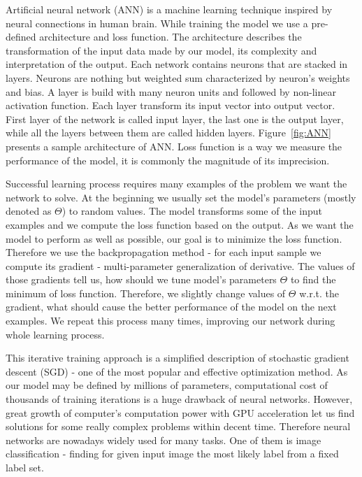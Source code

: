 \documentclass{article}
\begin{document}
Artificial neural network (ANN) is a machine learning technique inspired by neural connections in human brain. While training the model we use a pre-defined architecture and loss function. The architecture describes the transformation of the input data made by our model, its complexity and interpretation of the output. Each network contains neurons that are stacked in layers. Neurons are nothing but weighted sum characterized by neuron's weights and bias. A layer is build with many neuron units and followed by non-linear activation function. Each layer transform its input vector into output vector. First layer of the network is called input layer, the last one is the output layer, while all the layers between them are called hidden layers. Figure~\ref{fig:ANN} presents a sample architecture of ANN. Loss function is a way we measure the performance of the model, it is commonly the magnitude of its imprecision. 
\par
Successful learning process requires many examples of the problem we want the network to solve. At the beginning we usually set the model's parameters (mostly denoted as $\Theta$) to random values. The model transforms some of the input examples and we compute the loss function based on the output. As we want the model to perform as well as possible, our goal is to minimize the loss function. Therefore we use the backpropagation method - for each input sample we compute its gradient - multi-parameter generalization of derivative. The values of those gradients tell us, how should we tune model's parameters $\Theta$ to find the minimum of loss function. Therefore, we slightly change values of $\Theta$ w.r.t. the gradient, what should cause the better performance of the model on the next examples. We repeat this process many times, improving our network during whole learning process. 
\par
This iterative training approach is a simplified description of stochastic gradient descent (SGD) - one of the most popular and effective optimization method. As our model may be defined by millions of parameters, computational cost of thousands of training iterations is a huge drawback of neural networks. However, great growth of computer's computation power with GPU acceleration let us find solutions for some really complex problems within decent time.  Therefore neural networks are nowadays widely used for many tasks. One of them is image classification - finding for given input image the most likely label from a fixed label set.
\end{document}
